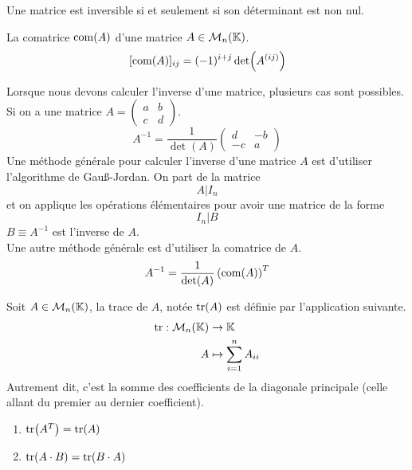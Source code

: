 \begin{proposition}
	Une matrice est inversible si et seulement si son déterminant est non nul.
\end{proposition}

\begin{definition}[Comatrice]
	La comatrice $\operatorname{com}(A)$ d'une matrice $A \in \mathcal{M}_n(\mathbb{K})$.
	$$
	[\operatorname{com}(A)]_{ij} = (-1)^{i + j} \det(A^{(ij)}) 
	$$
\end{definition}

\begin{proposition}
    Lorsque nous devons calculer l'inverse d'une matrice, plusieurs cas sont possibles.
    Si on a une matrice
    $A =
    \begin{pmatrix}
        a & b \\
        c & d
    \end{pmatrix}
    $.
    \[
    A^{-1} = \frac{1}{\det(A)} 
    \begin{pmatrix}
        d & -b \\
        -c & a
    \end{pmatrix}
    \]
    Une méthode générale pour calculer l'inverse d'une matrice $A$ est d'utiliser l'algorithme de Gau{\ss}-Jordan.
    On part de la matrice 
    \[ A|I_n \]
    et on applique les opérations élémentaires pour avoir une matrice de la forme
    \[I_n|B\]
    $B \equiv A^{-1}$ est l'inverse de $A$.
    \\
    Une autre méthode générale est d'utiliser la comatrice de $A$.
    \[ A^{-1} = \frac{1}{\det(A)} \left( \operatorname{com}(A) \right)^T \]
\end{proposition}

\begin{definition}
	Soit $A \in \mathcal{M}_n(\mathbb{K})$, la trace de $A$, notée $\tr(A)$ est définie par l'application suivante.
	\begin{align*}
		\tr : \mathcal{M}_n(\mathbb{K}) &\to \mathbb{K} \\
		A &\mapsto \sum_{i = 1}^{n} A_{ii}
	\end{align*}
    Autrement dit, c'est la somme des coefficients de la diagonale principale (celle allant du premier au dernier coefficient).
\end{definition}

\begin{lemma}
	\begin{multicols}{2}
	    \begin{enumerate}
    		\item $\tr(A^T) = \tr(A)$
    		\item $\tr(A \cdot B) = \tr(B \cdot A)$
    	\end{enumerate}
	\end{multicols}
\end{lemma}

